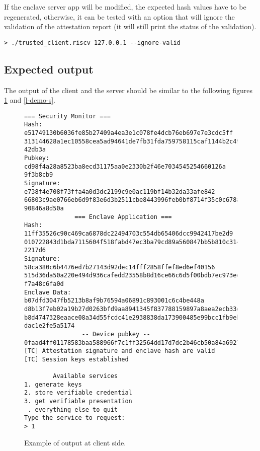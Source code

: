If the enclave server app will be modified, the expected hash values have to be regenerated, otherwise, it can be tested with an option that will ignore the validation of the attestation report (it will still print the status of the validation). \\

\begin{lstlisting}[style=terminal,frame=single]
> ./trusted_client.riscv 127.0.0.1 --ignore-valid        
\end{lstlisting}

\subsection{Expected output}
The output of the client and the server should be similar to the following figures \ref{l-demo-c} and \ref{l-demo-s}.
\begin{figure}[H]
\begin{lstlisting}[frame=single]
              === Security Monitor ===
Hash: e51749130b6036fe85b27409a4ea3e1c078fe4dcb76eb697e7e3cdc5ff
313144628a1ec10558cea5ad94641de7fb31fda759758115caf1144b2c49603f
42db3a
Pubkey: cd98f4a28a8523ba8ecd31175aa0e2330b2f46e7034545254660126a
9f3b8cb9
Signature: e738f4e708f73ffa4a0d3dc2199c9e0ac119bf14b32da33afe842
66803c9ae0766eb6d9f83e6d3b2511cbe8443996feb0bf8714f35c0c678aa593
90846a8d50a
              === Enclave Application ===
Hash: 11ff35526c90c469ca6878dc22494703c554db65406dcc9942417be2d9
010722843d1bda7115604f518fabd47ec3ba79cd89a560847bb5b810c314201e
2217d6
Signature: 58ca380c6b4476ed7b27143d92dec14fff2858ffef8ed6ef40156
515d36da50a220e494d936cafedd23558b8d16ce66c6d5f00bdb7ec973ee46ec
f7a48c6fa0d
Enclave Data: b07dfd3047fb5213b8af9b76594a06891c893001c6c4be448a
d8b13f7eb02a19b27d0263bfd9aa8941345f837788159897a8aea2ecb33da926
b8d4747328eaace08a34d55fcdc41e2938838da173900485e99bcc1fb9eb7b00
dac1e2fe5a5174
                -- Device pubkey --
0faad4ff01178583baa588966f7c1ff32564dd17d7dc2b46cb50a84a69270b4c
[TC] Attestation signature and enclave hash are valid
[TC] Session keys established

        Available services
1. generate keys
2. store verifiable credential
3. get verifiable presentation
 . everything else to quit 
Type the service to request:
> 1
\end{lstlisting}
\caption{Example of output at client side. \label{l-demo-c}}
\end{figure}
\newpage


